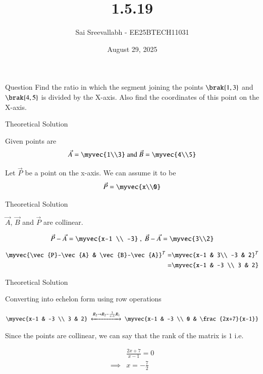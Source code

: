 \documentclass{beamer}
\title 
{1.5.19}
\date{August 29, 2025}
\author 
{Sai Sreevallabh - EE25BTECH11031}
\begin{document}
\frame{\titlepage}
\begin{frame}{Question}
Find the ratio in which the segment joining the points $\brak{1,3}$ and $\brak{4,5}$ is divided by the X-axis. Also find the coordinates of this point on the X-axis.
\end{frame}



\begin{frame}{Theoretical Solution}

Given points are\\
\begin{align}
    \vec{A}=\myvec{1\\3} \ \text{and}\  \vec{B}=\myvec{4\\5}
\end{align}

Let $\vec{P}$ be a point on the x-axis. We can assume it to be\\

\begin{align}
    \vec{P}=\myvec{x\\0}
\end{align}

\end{frame}


\begin{frame}{Theoretical Solution}

$\vec{A}$, $\vec{B}$ and $\vec{P}$ are collinear. 

\begin{align}
    \vec{P}-\vec{A}=\myvec{x-1 \\ -3} \ , \ 
    \vec{B}-\vec{A}=\myvec{3\\2}  
\end{align}

\begin{align}
    \myvec{\vec{P}-\vec{A} & \vec{B}-\vec{A}}^T =& \myvec{x-1 & 3\\ -3 & 2}^T\\
    =& \myvec{x-1 & -3 \\ 3 & 2}
\end{align}

\end{frame}

\begin{frame}{Theoretical Solution}

Converting into echelon form using row operations

\begin{align*}
    \myvec{x-1 & -3 \\ 3 & 2}\ \xleftrightarrow[]{R_2 \to R_2-\frac{3}{x-1}R_1} \  \myvec{x-1 & -3 \\ 0 & \frac{2x+7}{x-1}}
\end{align*}

Since the points are collinear, we can say that the rank of the matrix is $1$ i.e. 

\begin{align}
    &\frac{2x+7}{x-1} = 0\\
    \implies& x=-\frac{7}{2}
\end{align}

\end{frame}
\end{document}
